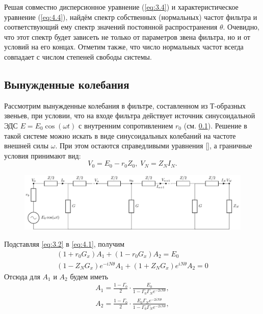 Решая совместно дисперсионное уравнение (\ref{eq:3.4}) и характеристическое уравнение (\ref{eq:4.4}), найдём спектр собственных (нормальных) частот фильтра и соответствующий ему спектр значений постоянной распространения $\theta$. Очевидно, что этот спектр будет зависеть не только от параметров звена фильтра, но и от условий на его концах. Отметим также, что число нормальных частот всегда совпадает с числом степеней свободы системы.


\subsection{Вынужденные колебания}
Рассмотрим вынужденные колебания в фильтре, составленном из Т-образных звеньев, при условии, что на входе фильтра действует источник синусоидальной ЭДС $E=E_0\cos(\omega t)$ с внутренним сопротивлением $r_0$ (см. \ref{}). Решение в такой системе можно искать в виде синусоидальных колебаний на частоте внешней силы $\omega$. При этом остаются справедливыми уравнения \eqref{}, а граничные условия принимают вид:
\begin{equation}
	\label{eq:4.1}
	V_0=E_0-r_0Z_0,\;V_N=Z_NI_N.
\end{equation}
\begin{figure}[h!]
	\centering
	\includegraphics[]{chem/picture3}
	\caption{}
	\label{fig:3}
\end{figure}
Подставляя \eqref{eq:3.2} в \eqref{eq:4.1}, получим 
\begin{equation}
	\label{eq:4.2}
	\begin{gathered}
	(1+r_0G_x)A_1+(1-r_0G_x)A_2=E_0\\
	(1-Z_NG_x)e^{-iN\theta}A_1+(1+Z_NG_x)e^{iN\theta}A_2=0
	\end{gathered}
\end{equation}
Отсюда для $A_1$ и $A_2$ будем иметь
\begin{equation}
	\label{eq:4.3}
	\begin{gathered}
	A_1=\frac{1-\Gamma_0}{2}\cdot\frac{E_0}{1-\Gamma_0\Gamma_Ne^{-2iN\theta}},\\
	A_2=\frac{1-\Gamma_0}{2}\cdot\frac{E_0\Gamma_Ne^{-2iN\theta}}{1-\Gamma_0\Gamma_Ne^{-2iN\theta}},\\
	\end{gathered}
\end{equation}
